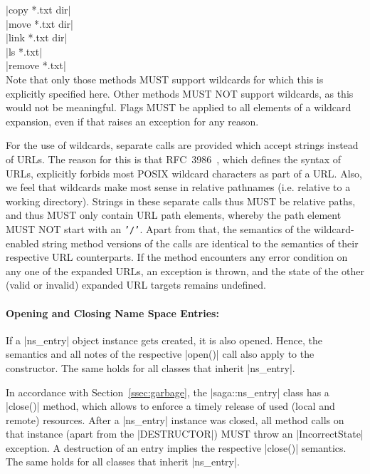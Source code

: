       \shift |copy   *.txt dir|\\
      \shift |move   *.txt dir|\\
      \shift |link   *.txt dir|\\
      \shift |ls     *.txt|\\
      \shift |remove *.txt|\\
 
 
    Note that only those methods MUST support
    wildcards for which this is explicitly specified here.  Other
    methods MUST NOT support wildcards, as this would not be
    meaningful.  Flags MUST be applied to all elements of a wildcard
    expansion, even if that raises an exception for any reason.
 
    For the use of wildcards, separate calls are provided
    which accept strings instead of URLs.  The reason for this is that
    RFC~3986~\cite{rfc-3986}, which defines the syntax of URLs,
    explicitly forbids most POSIX wildcard characters as part of a
    URL.  Also, we feel that wildcards make most sense in relative
    pathnames (i.e. relative to a working directory). Strings in these
    separate calls thus MUST be relative paths, and thus MUST only
    contain URL path elements, whereby the path element MUST NOT start
    with an \texttt{'/'}.  Apart from that, the semantics of the
    wildcard-enabled string method versions of the calls are identical
    to the semantics of their respective URL counterparts.  If the
    method encounters any error condition on any one of the expanded
    URLs, an exception is thrown, and the state of the other (valid or
    invalid) expanded URL targets remains undefined.
 
 
 
  \paragraph{Opening and Closing Name Space Entries:}
 
   If a |ns_entry| object instance gets created, it is also
   opened.  Hence, the semantics and all notes of the
   respective |open()| call also apply to the
   constructor.  The same holds for all classes that inherit
   |ns_entry|.
 
   In accordance with Section~\ref{ssec:garbage}, the
   |saga::ns_entry| class has a |close()| method, which allows
   to enforce a timely release of used (local and remote)
   resources.  After a |ns_entry| instance was closed, all
   method calls on that instance (apart from the
   |DESTRUCTOR|) MUST throw an |IncorrectState| exception.
   A destruction of an entry implies the respective |close()|
   semantics.  The same holds for all classes that inherit
   |ns_entry|.
 
